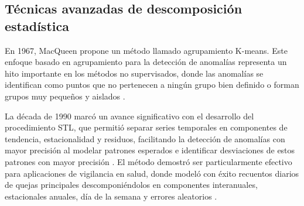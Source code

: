 \subsection{Técnicas avanzadas de descomposición estadística}

En 1967, MacQueen  propone un método llamado  agrupamiento K-means. Este enfoque basado en agrupamiento para la detección de anomalías representa un hito importante en los métodos no supervisados, donde las anomalías se identifican como puntos que no pertenecen a ningún grupo bien definido o forman grupos muy pequeños y aislados \cite{morissette_k-means_2013}.

La década de 1990 marcó un avance significativo con el desarrollo del procedimiento STL, que permitió separar series temporales en componentes de tendencia, estacionalidad y residuos, facilitando la detección de anomalías con mayor precisión al modelar patrones esperados e identificar desviaciones de estos patrones con mayor precisión \cite{cleveland_stl_1990}. El método demostró ser particularmente efectivo para aplicaciones de vigilancia en salud, donde modeló con éxito recuentos diarios de quejas principales descomponiéndolos en componentes interanuales, estacionales anuales, día de la semana y errores aleatorios \cite{hafen_syndromic_2009}. 
